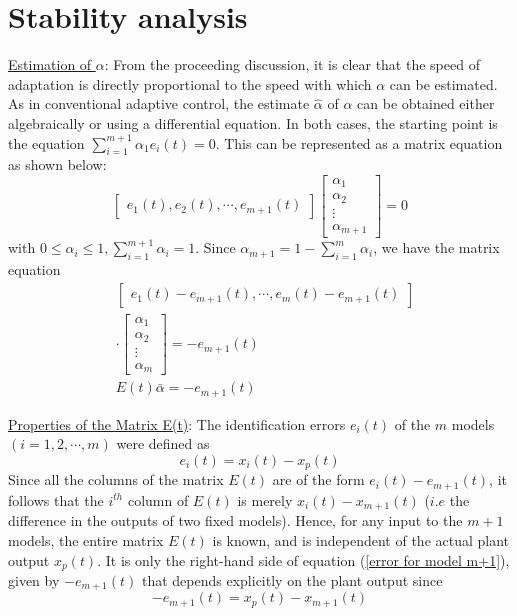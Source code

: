 \documentclass[conference]{IEEEtran}
\begin{document}
\section{Stability analysis}
{\large \underline{Estimation of $\alpha$}}: From the proceeding discussion, it is clear that the speed of adaptation is directly proportional to the speed with which $\alpha$ can be estimated. As in conventional adaptive control, the estimate $\hat{\alpha}$ of $\alpha$ can be obtained either algebraically or using a differential equation. In both cases, the starting point is the equation $\sum_{i=1}^{m+1}\alpha_{1}e_{i}(t)=0$. This can be represented as a matrix equation as shown below:
\begin{equation}
\label{convex combination of errors}
\left[\begin{array}{c}e_{1}(t),e_{2}(t),\cdots,e_{m+1}(t)\end{array}\right]\left[\begin{array}{l}\alpha_{1}\\ \alpha_{2}\\\vdots \\\alpha_{m+1}\end{array}\right]=0
\end{equation}
with $0\leq \alpha_{i}\leq1,\sum_{i=1}^{m+1}\alpha_{i}=1$. Since $\alpha_{m+1}=1-\sum_{i=1}^{m}\alpha_{i}$, we have the matrix equation
\begin{equation}
\begin{split}
\label{matrix form of combination}
&\left[\begin{array}{c}e_{1}(t)-e_{m+1}(t),\cdots,e_{m}(t)-e_{m+1}(t)\end{array}\right]\\
&\cdot\left[\begin{array}{l}\alpha_{1}\\ \alpha_{2}\\ \vdots \\ \alpha_{m}\end{array}\right]=-e_{m+1}(t)\\
&E(t)\bar{\alpha}=-e_{m+1}(t)
\end{split}
\end{equation}

{\large \underline{Properties of the Matrix E(t)}}: The identification errors $e_{i}(t)$ of the $m$ models $(i=1,2,\cdots,m)$ were defined as
\begin{equation}
\label{definition of identification error}
e_{i}(t)=x_{i}(t)-x_{p}(t)
\end{equation}
Since all the columns of the matrix $E(t)$ are of the form $e_{i}(t)-e_{m+1}(t)$, it follows that the $i^{th}$ column of $E(t)$ is merely $x_{i}(t)-x_{m+1}(t)$ ($i.e$ the difference in the outputs of two fixed models). Hence, for any input to the $m+1$ models, the entire matrix $E(t)$ is known, and is independent of the actual plant output $x_{p}(t)$. It is only the right-hand side of equation (\ref{error for model m+1}), given by $-e_{m+1}(t)$ that depends explicitly on the plant output since
\begin{equation}
\label{error for model m+1}
-e_{m+1}(t)=x_{p}(t)-x_{m+1}(t)
\end{equation}
\end{document}
